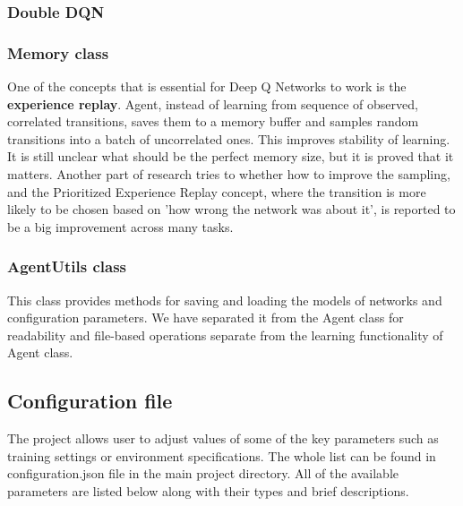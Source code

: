 \documentclass{article}
\begin{document}
\subsubsection{Double DQN}


\subsubsection{Memory class}
One of the concepts that is essential for Deep Q Networks to work is the \textbf{experience replay}. Agent, instead of learning from sequence of observed, correlated transitions, saves them to a memory buffer and samples random transitions into a batch of uncorrelated ones. This improves stability of learning. It is still unclear what should be the perfect memory size, but it is proved that it matters. Another part of research tries to whether how to improve the sampling, and the Prioritized Experience Replay concept, where the transition is more likely to be chosen based on 'how wrong the network was about it', is reported to be a big improvement across many tasks.


\subsubsection{AgentUtils class}
This class provides methods for saving and loading the models of networks and configuration parameters. We have separated it from the Agent class for readability and file-based operations separate from the learning functionality of Agent class.

\subsection{Configuration file}
The project allows user to adjust values of some of the key parameters such as training settings or environment specifications. The whole list can be found in configuration.json file in the main project directory. All of the available parameters are listed below along with their types and brief descriptions.
\end{document}
